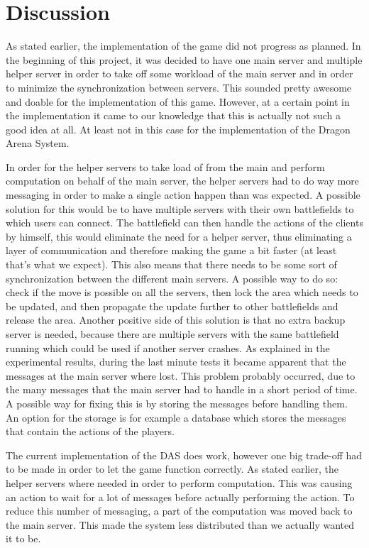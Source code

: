 \section{Discussion}
As stated earlier, the implementation of the game did not progress as planned.
In the beginning of this project, it was decided to have one main server and multiple helper server in order to take off some workload of the main server and in order to minimize the synchronization between servers.
This sounded pretty awesome and doable for the implementation of this game.
However, at a certain point in the implementation it came to our knowledge that this is actually not such a good idea at all.
At least not in this case for the implementation of the Dragon Arena System.

In order for the helper servers to take load of from the main and perform computation on behalf of the main server, the helper servers had to do way more messaging in order to make a single action happen than was expected.
A possible solution for this would be to have multiple servers with their own battlefields to which users can connect.
The battlefield can then handle the actions of the clients by himself, this would eliminate the need for a helper server, thus eliminating a layer of communication and therefore making the game a bit faster (at least that's what we expect). 
This also means that there needs to be some sort of synchronization between the different main servers.
A possible way to do so: check if the move is possible on all the servers, then lock the area which needs to be updated, and then propagate the update further to other battlefields and release the area.
Another positive side of this solution is that no extra backup server is needed, because there are multiple servers with the same battlefield running which could be used if another server crashes.
As explained in the experimental results, during the last minute tests it became apparent that the messages at the main server where lost. 
This problem probably occurred, due to the many messages that the main server had to handle in a short period of time. A possible way for fixing this is by storing the messages before handling them. An option for the storage is for example a database which stores the messages that contain the actions of the players.

The current implementation of the DAS does work, however one big trade-off had to be made in order to let the game function correctly.
As stated earlier, the helper servers where needed in order to perform computation. 
This was causing an action to wait for a lot of messages before actually performing the action.
To reduce this number of messaging, a part of the computation was moved back to the main server.
This made the system less distributed than we actually wanted it to be.

